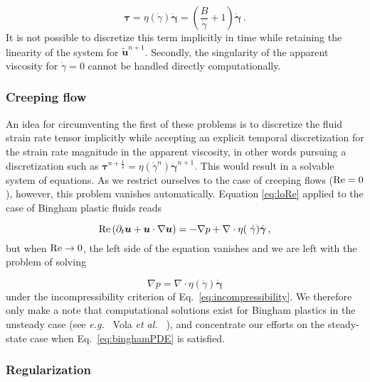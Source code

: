 \documentclass[final,3p,twocolumn]{elsarticle}
\begin{document}
\begin{equation} 
    \bm{\tau} = \eta(\dot{\gamma}) \bm{\dot{\gamma}} = \left(
    \frac{B}{\dot{\gamma}} + 1 \right) \dot{\bm{\gamma}} \,.
    \label{eq:binghamStress}
\end{equation}
%
It is not possible to discretize this term implicitly in time while retaining
the linearity of the system for $\tilde{\bm{u}}^{n+1}$. Secondly, the
singularity of the apparent viscosity for $\dot{\gamma}=0$ cannot be handled
directly computationally. 

\subsubsection{Creeping flow}

An idea for circumventing the first of these problems is to discretize the
fluid strain rate tensor implicitly while accepting an explicit temporal
discretization for the strain rate magnitude in the apparent viscosity, in
other words pursuing a discretization such as $\bm{\tau}^{n+\frac{1}{2}} =
\eta(\dot{\gamma}^{n}) \dot{\bm{\gamma}}^{n+1}$. This would result in a
solvable system of equations. As we restrict ourselves to the case of creeping
flows (${\rm Re}=0$), however, this problem vanishes automatically. Equation
\eqref{eq:loRe} applied to the case of Bingham plastic fluids reads 

\begin{equation}
    {\rm Re} \left( \partial_t \bm{u} + \bm{u} \cdot \nabla \bm{u} \right)  = -
    \nabla p + \nabla \cdot \eta ( \dot{\gamma} ) \dot{\bm{\gamma}} \,,
\end{equation}
%
but when ${\rm Re} \rightarrow 0$, the left side of the equation vanishes and we are left
with the problem of solving 

\begin{equation}
    \nabla p = \nabla \cdot \eta ( \dot{\gamma} ) \dot{\bm{\gamma}} 
    \label{eq:binghamPDE}
\end{equation}
%
under the incompressibility criterion of Eq.\ \eqref{eq:incompressibility}. We
therefore only make a note that computational solutions exist for Bingham
plastics in the unsteady case (see {\em e.g.\ } Vola {\em et al.\ }
\cite{vola2003laminar}), and concentrate our efforts on the steady-state case
when Eq.\ \eqref{eq:binghamPDE} is satisfied. 

\subsubsection{Regularization}
\end{document}
